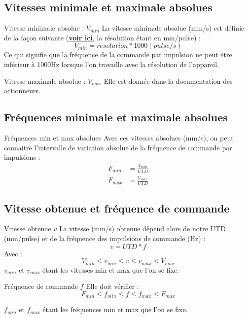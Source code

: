 \documentclass[a4paper,11pt]{beamer}
\begin{document}
\subsection{Vitesses minimale et maximale absolues}
\begin{frame}
\begin{alertblock}{Vitesse minimale absolue : $V_{min}$}
\justifying
La vitesse minimale absolue (mm/s) est définie de la façon suivante (\textcolor{blue}{\textbf{\underline{\href{https://raw.githubusercontent.com/fbuloup/Interface_IAI/main/Documentation/RCS4-SLIDER(ME3769-1H).pdf\#page=34}{voir ici}}}}, la résolution étant en mm/pulse) :
$$
V_{min} = resolution*1000(pulse/s)
$$
Ce qui signifie que la fréquence de la commande par impulsion ne peut être inférieur à 1000Hz lorsque l'on travaille avec la résolution de l'appareil.
\end{alertblock}

\begin{alertblock}{Vitesse maximale absolue : $V_{max}$}
\justifying
Elle est donnée dans la documentation des actionneurs.
\end{alertblock}
\end{frame}


\subsection{Fréquences minimale et maximale absolues}
\begin{frame}
\begin{alertblock}{Fréquences min et max absolues}
\justifying
Avec ces vitesses absolues (mm/s), on peut connaitre l'intervalle de variation absolue de la fréquence de commande par impulsions :
\begin{align*}
F_{min} &= \frac{V_{min}}{UTD} \\
F_{max} &= \frac{V_{max}}{UTD}
\end{align*}
\end{alertblock}
\end{frame}

\subsection{Vitesse obtenue et fréquence de commande}
\begin{frame}
\begin{alertblock}{Vitesse obtenue $v$}
\justifying
La vitesse (mm/s) obtenue dépend alors de notre UTD (mm/pulse) et de la fréquence des impulsions de commande (Hz) :
$$
v = UTD*f
$$
Avec : 
$$
V_{min} \leq v_{min} \leq v \leq v_{max} \leq V_{max}
$$
$v_{min}$  et $v_{max}$ étant les vitesses min et max que l'on se fixe.
\end{alertblock}
\begin{alertblock}{Fréquence de commande $f$}
\justifying
Elle doit vérifier :
$$
F_{min} \leq f_{min} \leq f \leq f_{max} \leq F_{max}
$$

$f_{min}$  et $f_{max}$ étant les fréquences min et max que l'on se fixe.
\end{alertblock}
\end{frame}
\end{document}
